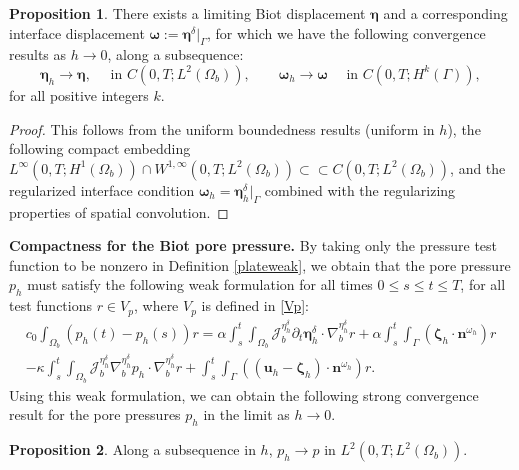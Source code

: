 \documentclass[11pt]{article}
\newcommand{\bd}{\boldsymbol}
\theoremstyle{definition}
\newtheorem{proposition}{Proposition}[section]
\begin{document}
\begin{proposition}\label{etahconv}
There exists a limiting Biot displacement $\bd{\eta}$ and a corresponding interface displacement $\bd{\omega} := \bd{\eta}^{\delta}|_{\Gamma}$, for which we have the following convergence results as $h \to 0$, along a subsequence:
\begin{equation*}
\bd{\eta}_{h} \to \bd{\eta}, \quad \text{ in } C(0, T; L^{2}(\Omega_{b})), \qquad \bd{\omega}_{h} \to \bd{\omega} \quad \text{ in } C(0, T; H^{k}(\Gamma)),
\end{equation*}
for all positive integers $k$.
\end{proposition}

\begin{proof}
This follows from the uniform boundedness results (uniform in $h$), the following compact embedding $L^{\infty}(0, T; H^{1}(\Omega_{b})) \cap W^{1, \infty}(0, T; L^{2}(\Omega_{b})) \subset \subset C(0, T; L^{2}(\Omega_{b}))$, and the regularized interface condition $\bd{\omega}_{h} = \bd{\eta}^{\delta}_{h}|_{\Gamma}$ combined with the regularizing properties of spatial convolution.
\end{proof}

\medskip

\noindent \textbf{Compactness for the Biot pore pressure.} By taking only the pressure test function to be nonzero in Definition \ref{plateweak}, we obtain that the pore pressure $p_{h}$ must satisfy the following weak formulation for all times $0 \le s \le t \le T$, for all test functions $r \in V_{p}$, where $V_{p}$ is defined in \eqref{Vp}:
\begin{multline}\label{poreincrement}
c_{0} \int_{\Omega_{b}} (p_{h}(t) - p_{h}(s)) r = \alpha \int_{s}^{t} \int_{\Omega_{b}} \mathcal{J}^{\eta_{h}^{\delta}}_{b} \partial_{t} \bd{\eta}^{\delta}_{h} \cdot \nabla^{\eta^{\delta}_{h}}_{b} r + \alpha \int_{s}^{t} \int_{\Gamma} (\bd{\zeta}_{h} \cdot \bd{n}^{\omega_{h}}) r \\
- \kappa \int_{s}^{t} \int_{\Omega_{b}} \mathcal{J}^{\eta^{\delta}_{h}}_{b} \nabla^{\eta^{\delta}_{h}}_{b} p_{h} \cdot \nabla^{\eta^{\delta}_{h}}_{b} r + \int_{s}^{t} \int_{\Gamma} ((\bd{u}_{h} - \bd{\zeta}_{h}) \cdot \bd{n}^{\omega_{h}}) r.
\end{multline}
Using this weak formulation, we can obtain the following strong convergence result for the pore pressures $p_{h}$ in the limit as $h \to 0$. 

\begin{proposition}\label{phconv}
Along a subsequence in $h$, $p_{h} \to p$ in $L^{2}(0, T; L^{2}(\Omega_{b}))$. 
\end{proposition}
\end{document}
